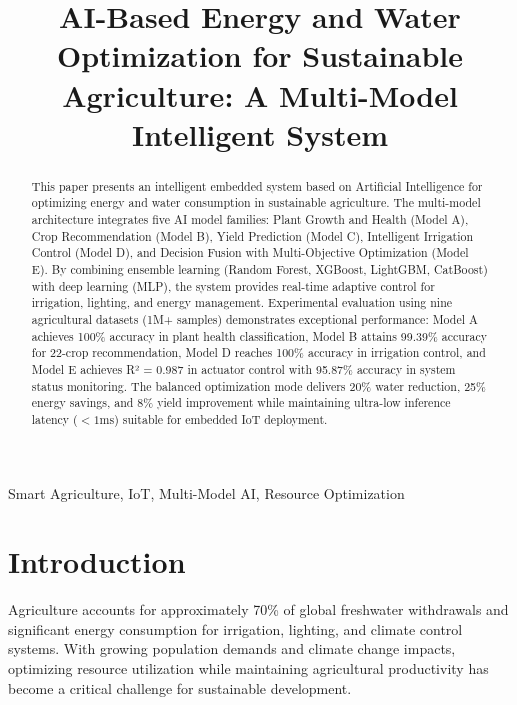 \documentclass[conference]{IEEEtran}
\begin{document}
\title{AI-Based Energy and Water Optimization for Sustainable Agriculture: A Multi-Model Intelligent System}

\author{
}

\maketitle

\begin{abstract}
This paper presents an intelligent embedded system based on Artificial Intelligence for optimizing energy and water consumption in sustainable agriculture. The multi-model architecture integrates five AI model families: Plant Growth and Health (Model A), Crop Recommendation (Model B), Yield Prediction (Model C), Intelligent Irrigation Control (Model D), and Decision Fusion with Multi-Objective Optimization (Model E). By combining ensemble learning (Random Forest, XGBoost, LightGBM, CatBoost) with deep learning (MLP), the system provides real-time adaptive control for irrigation, lighting, and energy management. Experimental evaluation using nine agricultural datasets (1M+ samples) demonstrates exceptional performance: Model A achieves 100\% accuracy in plant health classification, Model B attains 99.39\% accuracy for 22-crop recommendation, Model D reaches 100\% accuracy in irrigation control, and Model E achieves R² = 0.987 in actuator control with 95.87\% accuracy in system status monitoring. The balanced optimization mode delivers 20\% water reduction, 25\% energy savings, and 8\% yield improvement while maintaining ultra-low inference latency ($<1\text{ms}$) suitable for embedded IoT deployment.
\end{abstract}

\begin{IEEEkeywords}
Smart Agriculture, IoT, Multi-Model AI, Resource Optimization
\end{IEEEkeywords}

\section{Introduction}

Agriculture accounts for approximately 70\% of global freshwater withdrawals and significant energy consumption for irrigation, lighting, and climate control systems. With growing population demands and climate change impacts, optimizing resource utilization while maintaining agricultural productivity has become a critical challenge for sustainable development.
\end{document}
